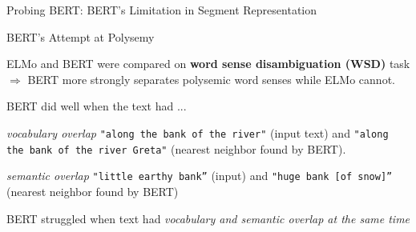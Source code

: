 \begin{frame}{Probing BERT: BERT's Limitation in Segment Representation}
\begin{figure}
\begin{minipage}{.47\textwidth}
      \vspace{-15pt}
      \label{fig:bertGradient}
    \end{minipage}
    \end{figure}

    
\end{frame}



\begin{frame}{BERT's Attempt at Polysemy}
    
    \vspace{15pt}
    
    \begin{itemizeSpaced}{7pt}
    
        \item ELMo and BERT were compared on \textbf{word sense disambiguation (WSD)} task $\Rightarrow$ BERT more strongly separates polysemic word senses while ELMo cannot. 
        
        \item BERT did well when the text had ...
        \vspace{5pt}
        \begin{itemizeSpaced}{7pt}
            \item \textit{vocabulary overlap}  \texttt{"along the bank of the river"} (input text) and \texttt{"along the bank of the river Greta"} (nearest neighbor found by BERT). 
            
            \item \textit{semantic overlap} \texttt{"little earthy bank”} (input) and \texttt{"huge bank [of snow]”} (nearest neighbor found by BERT)
        \end{itemizeSpaced}
        
        \item BERT struggled when text had \emph{vocabulary and semantic overlap at the same time}
        
        \begin{itemizeSpaced}{7pt}
        
            

\end{itemizeSpaced}
\end{itemizeSpaced}
\end{frame}
